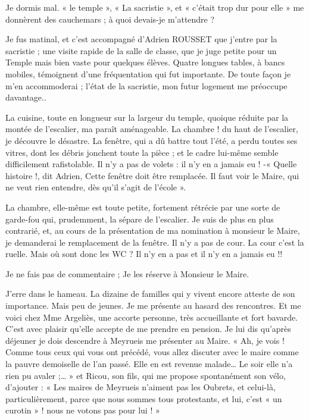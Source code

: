 
Je dormis mal. « le temple », « La sacristie », et « c’était trop dur pour elle » me
donnèrent des cauchemars ; à quoi devais-je m’attendre ?

Je fus matinal, et c’est accompagné d’Adrien ROUSSET que j’entre par la sacristie ;
une visite rapide de la salle de classe, que je juge petite pour un Temple mais bien
vaste pour quelques élèves. Quatre longues tables, à bancs mobiles, témoignent d’une
fréquentation qui fut importante. De toute façon je m’en accommoderai ; l’état de la
sacristie, mon futur logement me préoccupe davantage..

La cuisine, toute en longueur sur la largeur du temple, quoique réduite par la montée
de l’escalier, ma paraît aménageable. La chambre ! du haut de l’escalier, je découvre
le désastre. La fenêtre, qui a dû battre tout l’été, a perdu toutes ses vitres, dont les
débris jonchent toute la pièce ; et le cadre lui-même semble difficilement rafistolable.
Il n’y a pas de volets : il n’y en a jamais eu !
-« Quelle histoire !, dit Adrien, Cette fenêtre doit être remplacée. Il faut voir le
Maire, qui ne veut rien entendre, dès qu’il s’agit de l’école ».

La chambre, elle-même est toute petite, fortement rétrécie par une sorte de garde-fou
qui, prudemment, la sépare de l’escalier.
Je suis de plus en plus contrarié, et, au cours de la présentation de ma nomination à
monsieur le Maire, je demanderai le remplacement de la fenêtre.
Il n’y a pas de cour. La cour c’est la ruelle. Mais où sont donc les WC ? Il n’y en a
pas et il n’y en a jamais eu !!

Je ne fais pas de commentaire ; Je les réserve à Monsieur le Maire.

J’erre dans le hameau. La dizaine de familles qui y vivent encore atteste de son
importance. Mais peu de jeunes. Je me présente au hasard des rencontres. Et me voici
chez Mme Argeliès, une accorte personne, très accueillante et fort bavarde. C’est
avec plaisir qu’elle accepte de me prendre en pension. Je lui dis qu’après déjeuner je
dois descendre à Meyrueis me présenter au Maire.
« Ah, je vois ! Comme tous ceux qui vous ont précédé, vous allez discuter avec le
maire comme la pauvre demoiselle de l’an passé. Elle en est revenue malade… Le
soir elle n’a rien pu avaler ;… »
et Ricou, son fils, qui me propose spontanément son vélo, d’ajouter :
« Les maires de Meyrueis n’aiment pas les Oubrets, et celui-là, particulièrement,
parce que nous sommes tous protestants, et lui, c’est « un curotin » ! nous ne votons
pas pour lui ! »


